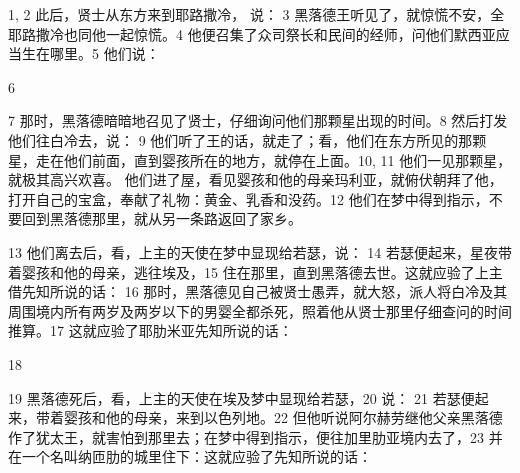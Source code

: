 1, 2  此后，贤士从东方来到耶路撒冷， 说： 3  黑落德王听见了，就惊慌不安，全耶路撒冷也同他一起惊慌。4  他便召集了众司祭长和民间的经师，问他们默西亚应当生在哪里。5  他们说：\par

6  \par

7  那时，黑落德暗暗地召见了贤士，仔细询问他们那颗星出现的时间。8  然后打发他们往白冷去，说： 9  他们听了王的话，就走了；看，他们在东方所见的那颗星，走在他们前面，直到婴孩所在的地方，就停在上面。10, 11  他们一见那颗星，就极其高兴欢喜。 他们进了屋，看见婴孩和他的母亲玛利亚，就俯伏朝拜了他，打开自己的宝盒，奉献了礼物：黄金、乳香和没药。12  他们在梦中得到指示，不要回到黑落德那里，就从另一条路返回了家乡。\par

13  他们离去后，看，上主的天使在梦中显现给若瑟，说： 14  若瑟便起来，星夜带着婴孩和他的母亲，逃往埃及，15  住在那里，直到黑落德去世。这就应验了上主借先知所说的话： 16  那时，黑落德见自己被贤士愚弄，就大怒，派人将白冷及其周围境内所有两岁及两岁以下的男婴全都杀死，照着他从贤士那里仔细查问的时间推算。17  这就应验了耶肋米亚先知所说的话：\par

18  \par

19  黑落德死后，看，上主的天使在埃及梦中显现给若瑟，20  说： 21  若瑟便起来，带着婴孩和他的母亲，来到以色列地。22  但他听说阿尔赫劳继他父亲黑落德作了犹太王，就害怕到那里去；在梦中得到指示，便往加里肋亚境内去了，23  并在一个名叫纳匝肋的城里住下：这就应验了先知所说的话：\par

